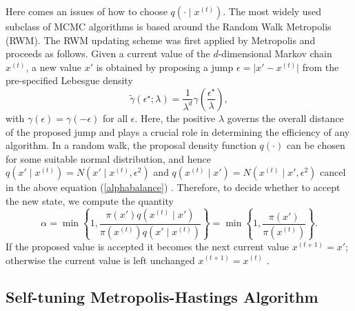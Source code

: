 Here comes an issues of how to choose $q\left(\cdot\mid x^{(t)}\right)$. The most widely used subclass of MCMC algorithms is based around the Random Walk Metropolis (RWM). The RWM updating scheme was first applied by Metropolis \cite{metropolis1953equation} and proceeds as follows. Given a current value of the $d$-dimensional Markov chain $x^{(t)}$, a new value $x'$ is obtained by proposing a jump $\epsilon = \lvert x' - x^{(t)} \rvert  $ from the pre-specified Lebesgue density 
\begin{equation}\label{stepsizeep}
\tilde{\gamma}\left(\epsilon^\star;\lambda\right) = \frac{1}{\lambda^d}\gamma \left( \frac{\epsilon^\star}{\lambda} \right),
\end{equation}
with $\gamma(\epsilon) = \gamma(-\epsilon)$ for all $\epsilon$. Here, the positive $\lambda$ governs the overall distance of the proposed jump and plays a crucial role in determining the efficiency of any algorithm. In a random walk, the proposal density function $q(\cdot)$ can be chosen for some suitable normal distribution, and hence $q\left(x'\mid x^{\left(t\right)}\right)=N\left(x'\mid x^{\left(t\right)},\epsilon^2\right)$ and $q\left(x^{\left(t\right)}\mid x'\right)=N\left(x^{\left(t\right)}\mid x',\epsilon^2\right)$ cancel in the above equation (\ref{alphabalance}) \cite{sherlock2016adaptive}. Therefore, to decide whether to accept the new state, we compute the quantity
\begin{equation}
\alpha=\min \left\lbrace 1,\frac{\pi\left(x'\right) q\left( x^{\left(t\right)}\mid x'\right) }{\pi\left(x^{\left(t\right)}\right)  q\left( x'\mid x^{\left(t\right)} \right) }  \right\rbrace= \min \left\lbrace 1,\frac{\pi\left(x'\right)  }{\pi\left(x^{\left(t\right)}\right) }  \right\rbrace.
\end{equation}
If the proposed value is accepted it becomes the next current value $x^{(t+1)}= x'$; otherwise the current value is left unchanged $x^{(t+1)} = x^{(t)}$ \cite{sherlock2010random}. 


\subsection{Self-tuning Metropolis-Hastings Algorithm}

